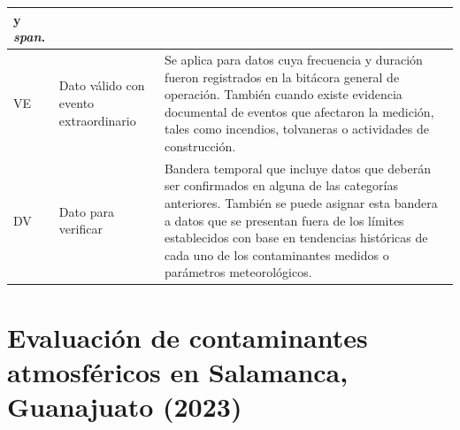 {\begin{longtable}{@{}l L{.17\textwidth} L{.62\textwidth}@{}}
y \textit{span}. \\
\midrule
VE & Dato válido con evento extraordinario &
Se aplica para datos cuya frecuencia y duración fueron registrados en
la bitácora general de operación. También cuando existe evidencia
documental de eventos que afectaron la medición, tales como incendios,
tolvaneras o actividades de construcción. \\
\midrule
DV & Dato para verificar &
Bandera temporal que incluye datos que deberán ser confirmados en alguna
de las categorías anteriores. También se puede asignar esta bandera a
datos que se presentan fuera de los límites establecidos con base en
tendencias históricas de cada uno de los contaminantes medidos o
parámetros meteorológicos. \\
\end{longtable}}

\chapter{Evaluación de contaminantes atmosféricos en Salamanca, Guanajuato
(2023)}
\label{anexo:graf_historico}


